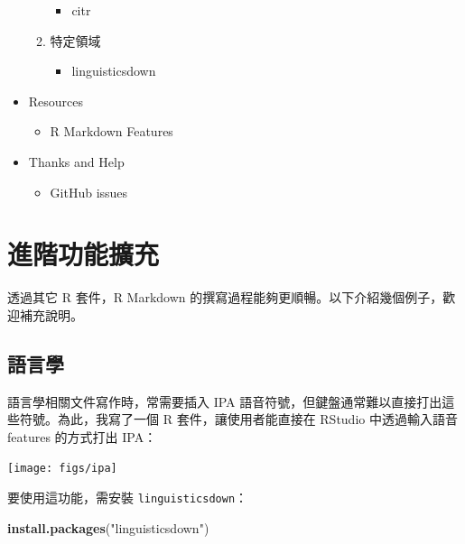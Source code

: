 \documentclass[oneside]{book}
\newenvironment{Shaded}{\begin{snugshade}}{\end{snugshade}}
\newcommand{\KeywordTok}[1]{\textcolor[rgb]{0.13,0.29,0.53}{\textbf{#1}}}
\newcommand{\StringTok}[1]{\textcolor[rgb]{0.31,0.60,0.02}{#1}}
\newcommand{\NormalTok}[1]{#1}
\providecommand{\tightlist}{%
  \setlength{\itemsep}{0pt}\setlength{\parskip}{0pt}}
\begin{document}
\begin{itemize}
\begin{enumerate}
    \begin{itemize}
    \tightlist
    \item
      citr
    \end{itemize}
  \item
    特定領域

    \begin{itemize}
    \tightlist
    \item
      linguisticsdown
    \end{itemize}
  \end{enumerate}
\item
  Resources

  \begin{itemize}
  \tightlist
  \item
    R Markdown Features
  \end{itemize}
\item
  Thanks and Help

  \begin{itemize}
  \tightlist
  \item
    GitHub issues
  \end{itemize}
\end{itemize}

\chapter{進階功能擴充}\label{add-on}

透過其它 R 套件，R Markdown
的撰寫過程能夠更順暢。以下介紹幾個例子，歡迎補充說明。

\section{語言學}\label{ling}

語言學相關文件寫作時，常需要插入 IPA
語音符號，但鍵盤通常難以直接打出這些符號。為此，我寫了一個 R
套件，讓使用者能直接在 RStudio 中透過輸入語音 features 的方式打出 IPA：

\begin{center}\texttt{[image: figs/ipa]} \end{center}

要使用這功能，需安裝 \texttt{linguisticsdown}：

\begin{Shaded}
\begin{Highlighting}[]
\KeywordTok{install.packages}\NormalTok{(}\StringTok{"linguisticsdown"}\NormalTok{)}
\end{Highlighting}
\end{Shaded}
\end{document}
